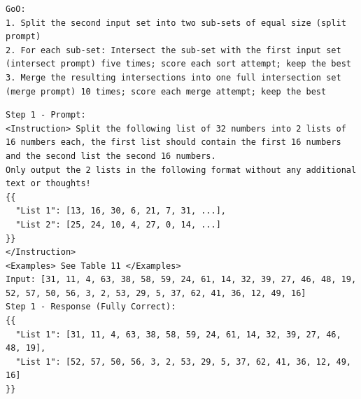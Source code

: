 \documentclass[11pt,UTF8,fontset=fandol]{ctexart}
\begin{document}
\begin{table}[H]\centering
\caption{对两个 32 元素集合求交集：执行计划（GoO）。}
\label{tab:12}
\end{table}
\begin{lstlisting}
GoO:
1. Split the second input set into two sub-sets of equal size (split prompt)
2. For each sub-set: Intersect the sub-set with the first input set (intersect prompt) five times; score each sort attempt; keep the best
3. Merge the resulting intersections into one full intersection set (merge prompt) 10 times; score each merge attempt; keep the best
\end{lstlisting}

\begin{table}[H]\centering
\caption{对两个 32 元素集合求交集：第 1 步（提示/回复）。}
\label{tab:13}
\end{table}
\begin{lstlisting}
Step 1 - Prompt:
<Instruction> Split the following list of 32 numbers into 2 lists of 16 numbers each, the first list should contain the first 16 numbers and the second list the second 16 numbers.
Only output the 2 lists in the following format without any additional text or thoughts!
{{
  "List 1": [13, 16, 30, 6, 21, 7, 31, ...],
  "List 2": [25, 24, 10, 4, 27, 0, 14, ...]
}}
</Instruction>
<Examples> See Table 11 </Examples>
Input: [31, 11, 4, 63, 38, 58, 59, 24, 61, 14, 32, 39, 27, 46, 48, 19, 52, 57, 50, 56, 3, 2, 53, 29, 5, 37, 62, 41, 36, 12, 49, 16]
Step 1 - Response (Fully Correct):
{{
  "List 1": [31, 11, 4, 63, 38, 58, 59, 24, 61, 14, 32, 39, 27, 46, 48, 19],
  "List 1": [52, 57, 50, 56, 3, 2, 53, 29, 5, 37, 62, 41, 36, 12, 49, 16]
}}
\end{lstlisting}
\end{document}
